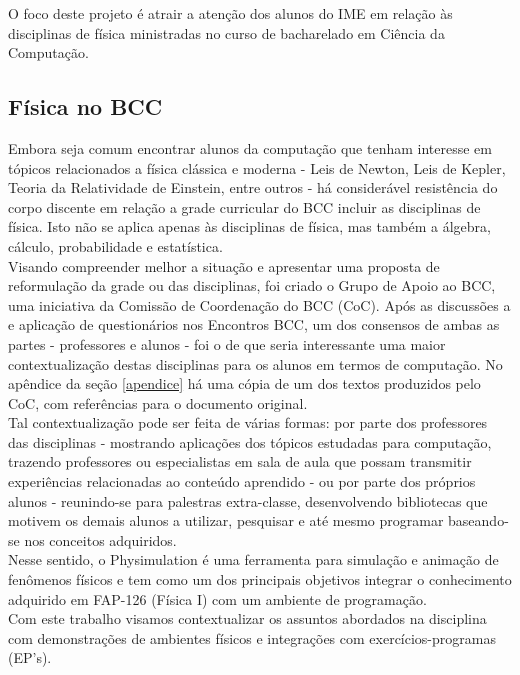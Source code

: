 
O foco deste projeto é atrair a atenção dos alunos do IME em relação às disciplinas de física ministradas no curso de bacharelado em Ciência da Computação.

\subsection{Física no BCC}
Embora seja comum encontrar alunos da computação que tenham interesse em tópicos relacionados a física clássica e moderna - Leis de Newton, Leis de Kepler, Teoria da Relatividade de Einstein, entre outros - há considerável resistência do corpo discente em relação a grade curricular do BCC incluir as disciplinas de física. Isto não se aplica apenas às disciplinas de física, mas também a álgebra, cálculo, probabilidade e estatística. \cite{paca}\\

Visando compreender melhor a situação e apresentar uma proposta de reformulação da grade ou das disciplinas, foi criado o Grupo de Apoio ao BCC, uma iniciativa da Comissão de Coordenação do BCC (CoC). Após as discussões a e aplicação de questionários nos Encontros BCC, um dos consensos de ambas as partes - professores e alunos - foi o de que seria interessante uma maior contextualização destas disciplinas para os alunos em termos de computação. No apêndice da seção \ref{apendice} há uma cópia de um dos textos produzidos pelo CoC, com referências para o documento original. \\

Tal contextualização pode ser feita de várias formas: por parte dos professores das disciplinas - mostrando aplicações dos tópicos estudadas para computação, trazendo professores ou especialistas em sala de aula que possam transmitir experiências relacionadas ao conteúdo aprendido - ou por parte dos próprios alunos - reunindo-se para palestras extra-classe, desenvolvendo bibliotecas que motivem os demais alunos a utilizar, pesquisar e até mesmo programar baseando-se nos conceitos adquiridos. \\

Nesse sentido, o Physimulation é uma ferramenta para simulação e animação de fenômenos físicos e tem como um dos principais objetivos integrar o conhecimento adquirido em FAP-126 (Física I) com um ambiente de programação. \\

Com este trabalho visamos contextualizar os assuntos abordados na disciplina com demonstrações de ambientes físicos e integrações com exercícios-programas (EP's). 

